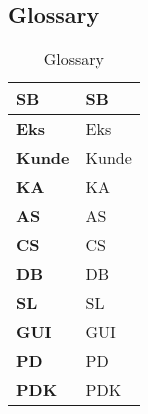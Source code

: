 \subsection{Glossary}

\begin{table}[H]
\begin{tabularx}{\textwidth}{|p{4cm}|X|}
\hline
\textbf{\gls{SB}} & \glsdesc{SB}\\\hline
\textbf{\gls{Eks}} & \glsdesc{Eks} \\\hline
\textbf{\gls{Kunde}} & \glsdesc{Kunde} \\\hline
\textbf{\gls{KA}} & \glsdesc{KA} \\\hline
\textbf{\gls{AS}} & \glsdesc{AS} \\\hline
\textbf{\gls{CS}} & \glsdesc{CS} \\\hline
\textbf{\gls{DB}} & \glsdesc{DB} \\\hline
\textbf{\gls{SL}} & \glsdesc{SL} \\\hline
\textbf{\gls{GUI}} & \glsdesc{GUI} \\\hline
\textbf{\gls{PD}} & \glsdesc{PD} \\\hline
\textbf{\gls{PDK}} & \glsdesc{PDK} \\\hline
\end{tabularx}
\caption{Glossary}
\label{tab:ATspk}
\end{table}
